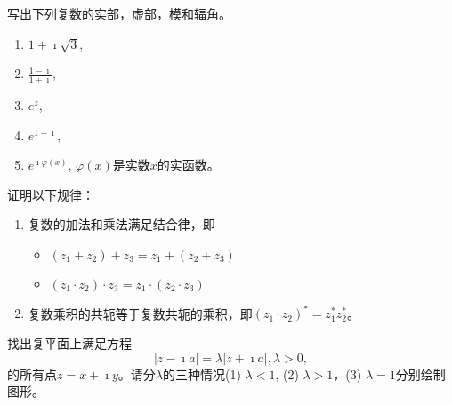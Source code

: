 \documentclass[10pt]{article}
\newenvironment{problem}[2][]{\begin{trivlist}
\item[\hskip \labelsep {\bfseries #1}\hskip \labelsep {\bfseries #2}]}{\end{trivlist}}
\begin{document}
\renewcommand{\labelenumi}{(\arabic{enumi})}
\renewcommand{\labelenumii}{(\arabic{enumi}.\arabic{enumii})}



 

\begin{problem}{1.1}
写出下列复数的实部，虚部，模和辐角。
\begin{enumerate}
  \item $1 + \imath \sqrt{3}$,
  \item $\frac{1-\imath}{1+\imath}$,
  \item $e^{z}$,
  \item $e^{1+\imath}$,
  \item $e^{\imath \varphi(x)}$, $\varphi(x)$是实数$x$的实函数。
\end{enumerate}
\end{problem}


\begin{problem}{1.2}
  证明以下规律：
  \begin{enumerate}
    \item 复数的加法和乘法满足结合律，即 
    \begin{itemize}
      \item $(z_1 + z_2 ) + z_3 = z_1 +( z_2 + z_3)$
      \item $(z_1 \cdot z_2) \cdot z_3 = z_1 \cdot (z_2 \cdot z_3)$
    \end{itemize}

    \item 复数乘积的共轭等于复数共轭的乘积，即$(z_1 \cdot z_2)^* = z_1^* z_2^*$。
  \end{enumerate}  
\end{problem}

\begin{problem}{1.3}
  找出复平面上满足方程\[|z - \imath a|  = \lambda | z + \imath a|, \lambda > 0,\]
  的所有点$z = x + \imath y$。请分$\lambda$的三种情况(1) $\lambda<1$, (2) $\lambda >1$，(3) $\lambda = 1$分别绘制图形。
\end{problem}
\end{document}

